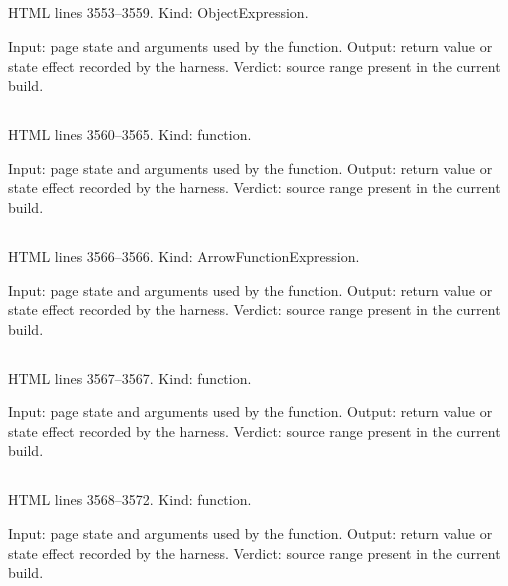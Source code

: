 \subsection*{\texttt{}}
\label{vf_115_QS_DEFAULT_COLS}
HTML lines 3553--3559. Kind: ObjectExpression.

Input: page state and arguments used by the function.
Output: return value or state effect recorded by the harness.
Verdict: source range present in the current build.

\subsection*{\texttt{}}
\label{vf_116_qsCols}
HTML lines 3560--3565. Kind: function.

Input: page state and arguments used by the function.
Output: return value or state effect recorded by the harness.
Verdict: source range present in the current build.

\subsection*{\texttt{}}
\label{vf_117_pad2}
HTML lines 3566--3566. Kind: ArrowFunctionExpression.

Input: page state and arguments used by the function.
Output: return value or state effect recorded by the harness.
Verdict: source range present in the current build.

\subsection*{\texttt{}}
\label{vf_118_qsCalDate}
HTML lines 3567--3567. Kind: function.

Input: page state and arguments used by the function.
Output: return value or state effect recorded by the harness.
Verdict: source range present in the current build.

\subsection*{\texttt{}}
\label{vf_119_qsStamp}
HTML lines 3568--3572. Kind: function.

Input: page state and arguments used by the function.
Output: return value or state effect recorded by the harness.
Verdict: source range present in the current build.

